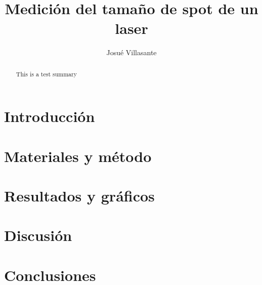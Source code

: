 \documentclass[twocolumn]{article}
\author{Josué Villasante}
\title{Medición del tamaño de spot de un laser}
\begin{document}
	\maketitle
	\begin{abstract}
		This is a test summary
	\end{abstract}
	\section{Introducción}
	\section{Materiales y método}
	\section{Resultados y gráficos}
	\section{Discusión}
	\section{Conclusiones}
\end{document}
